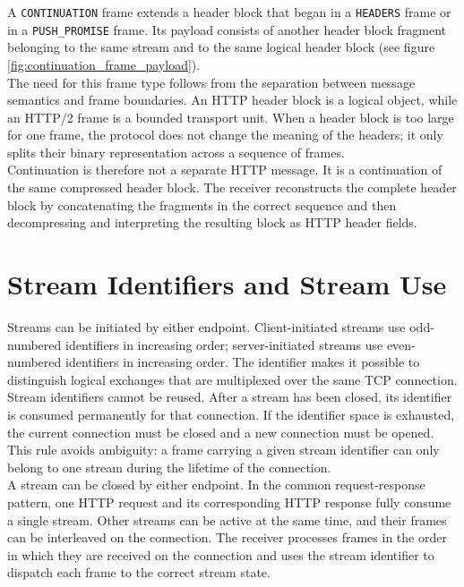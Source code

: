 \documentclass{scrbook}
\begin{document}
A \texttt{CONTINUATION} frame extends a header block that began in a \texttt{HEADERS} frame or in a \texttt{PUSH\_PROMISE} frame. Its payload consists of another header block fragment belonging to the same stream and to the same logical header block (see figure \ref{fig:continuation_frame_payload}).\\

The need for this frame type follows from the separation between message semantics and frame boundaries. An HTTP header block is a logical object, while an HTTP/2 frame is a bounded transport unit. When a header block is too large for one frame, the protocol does not change the meaning of the headers; it only splits their binary representation across a sequence of frames.\\

Continuation is therefore not a separate HTTP message. It is a continuation of the same compressed header block. The receiver reconstructs the complete header block by concatenating the fragments in the correct sequence and then decompressing and interpreting the resulting block as HTTP header fields.

\section{Stream Identifiers and Stream Use}

Streams can be initiated by either endpoint. Client-initiated streams use odd-numbered identifiers in increasing order; server-initiated streams use even-numbered identifiers in increasing order. The identifier makes it possible to distinguish logical exchanges that are multiplexed over the same TCP connection.\\

Stream identifiers cannot be reused. After a stream has been closed, its identifier is consumed permanently for that connection. If the identifier space is exhausted, the current connection must be closed and a new connection must be opened. This rule avoids ambiguity: a frame carrying a given stream identifier can only belong to one stream during the lifetime of the connection.\\

A stream can be closed by either endpoint. In the common request-response pattern, one HTTP request and its corresponding HTTP response fully consume a single stream. Other streams can be active at the same time, and their frames can be interleaved on the connection. The receiver processes frames in the order in which they are received on the connection and uses the stream identifier to dispatch each frame to the correct stream state.
\end{document}
